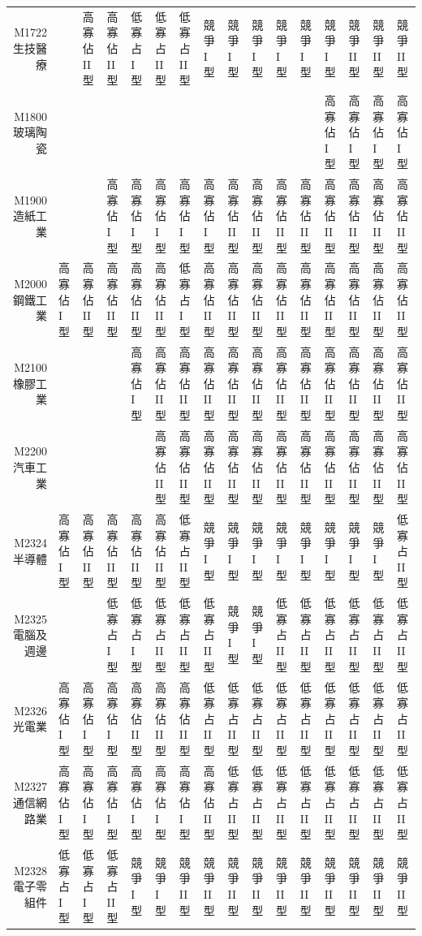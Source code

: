 \documentclass[a4paper]{article}\usepackage[]{graphicx}\usepackage[]{color}
\begin{document}
\begin{landscape}
\begin{table}[ht]
{\begin{tabular}{rlllllllllllllll}
  M1722生技醫療 &  & 高寡佔II 型 & 高寡佔II 型 & 低寡占I 型 & 低寡占II 型 & 低寡占II 型 & 競爭I 型 & 競爭I 型 & 競爭I 型 & 競爭I 型 & 競爭I 型 & 競爭I 型 & 競爭II 型 & 競爭II 型 & 競爭II 型 \\ 
  M1800玻璃陶瓷 &  &  &  &  &  &  &  &  &  &  &  & 高寡佔I 型 & 高寡佔I 型 & 高寡佔I 型 & 高寡佔I 型 \\ 
  M1900造紙工業 &  &  & 高寡佔I 型 & 高寡佔I 型 & 高寡佔I 型 & 高寡佔I 型 & 高寡佔I 型 & 高寡佔II 型 & 高寡佔II 型 & 高寡佔II 型 & 高寡佔II 型 & 高寡佔II 型 & 高寡佔II 型 & 高寡佔II 型 & 高寡佔II 型 \\ 
  M2000鋼鐵工業 & 高寡佔I 型 & 高寡佔II 型 & 高寡佔II 型 & 高寡佔II 型 & 高寡佔II 型 & 低寡占I 型 & 高寡佔II 型 & 高寡佔II 型 & 高寡佔II 型 & 高寡佔II 型 & 高寡佔II 型 & 高寡佔II 型 & 高寡佔II 型 & 高寡佔II 型 & 高寡佔II 型 \\ 
  M2100橡膠工業 &  &  &  & 高寡佔I 型 & 高寡佔II 型 & 高寡佔II 型 & 高寡佔II 型 & 高寡佔II 型 & 高寡佔II 型 & 高寡佔II 型 & 高寡佔II 型 & 高寡佔II 型 & 高寡佔II 型 & 高寡佔II 型 & 高寡佔II 型 \\ 
  M2200汽車工業 &  &  &  &  & 高寡佔II 型 & 高寡佔II 型 & 高寡佔II 型 & 高寡佔II 型 & 高寡佔II 型 & 高寡佔II 型 & 高寡佔II 型 & 高寡佔II 型 & 高寡佔II 型 & 高寡佔II 型 & 高寡佔II 型 \\ 
  M2324半導體 & 高寡佔I 型 & 高寡佔II 型 & 高寡佔II 型 & 高寡佔II 型 & 高寡佔II 型 & 低寡占II 型 & 競爭I 型 & 競爭I 型 & 競爭I 型 & 競爭I 型 & 競爭I 型 & 競爭I 型 & 競爭I 型 & 競爭I 型 & 低寡占II 型 \\ 
  M2325電腦及週邊 &  &  & 低寡占I 型 & 低寡占I 型 & 低寡占II 型 & 低寡占II 型 & 低寡占II 型 & 競爭I 型 & 競爭I 型 & 低寡占II 型 & 低寡占II 型 & 低寡占II 型 & 低寡占II 型 & 低寡占II 型 & 低寡占II 型 \\ 
  M2326光電業 & 高寡佔I 型 & 高寡佔I 型 & 高寡佔I 型 & 高寡佔II 型 & 高寡佔II 型 & 高寡佔II 型 & 低寡占II 型 & 低寡占II 型 & 低寡占II 型 & 低寡占II 型 & 低寡占II 型 & 低寡占II 型 & 低寡占II 型 & 低寡占II 型 & 低寡占II 型 \\ 
  M2327通信網路業 & 高寡佔I 型 & 高寡佔I 型 & 高寡佔I 型 & 高寡佔I 型 & 高寡佔I 型 & 高寡佔I 型 & 高寡佔II 型 & 低寡占II 型 & 低寡占II 型 & 低寡占II 型 & 低寡占II 型 & 低寡占II 型 & 低寡占II 型 & 低寡占II 型 & 低寡占II 型 \\ 
  M2328電子零組件 & 低寡占I 型 & 低寡占I 型 & 低寡占II 型 & 競爭I 型 & 競爭I 型 & 競爭II 型 & 競爭II 型 & 競爭II 型 & 競爭II 型 & 競爭II 型 & 競爭II 型 & 競爭II 型 & 競爭II 型 & 競爭II 型 & 競爭II 型 \\ 

\end{tabular}}
\end{table}
\end{landscape}
\end{document}
